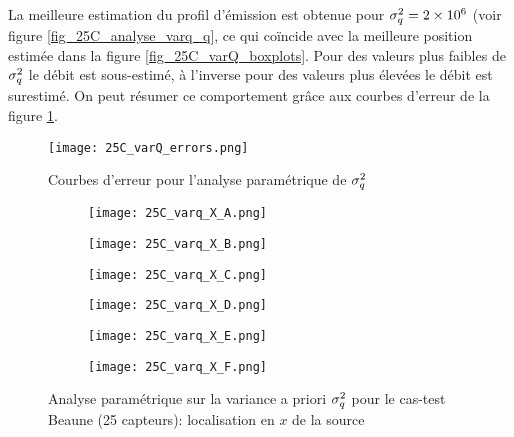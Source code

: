 La meilleure estimation du profil d'émission est obtenue pour $\sigma_q^2=2\times 10^6$ (voir figure \ref{fig_25C_analyse_varq_q}, ce qui coïncide avec la meilleure position estimée dans la figure \ref{fig_25C_varQ_boxplots}. Pour des valeurs plus faibles de $\sigma_q^2$ le débit est sous-estimé, à l'inverse pour des valeurs plus élevées le débit est surestimé. On peut résumer ce comportement grâce aux courbes d'erreur de la figure \ref{fig_25C_varq_erreurs}.

         \begin{figure}[h!]
         	\centering
         	\texttt{[image: 25C\_varQ\_errors.png]}
         	\caption{Courbes d'erreur pour l'analyse paramétrique de $\sigma_q^2$}
         	\label{fig_25C_varq_erreurs}
         \end{figure}
 



\begin{figure}[p!]
	\centering
	\begin{subfigure}[t]{0.5\textwidth}
		\centering
		\texttt{[image: 25C\_varq\_X\_A.png]}
		\caption{}
		\label{varq_A_x}
	\end{subfigure}%
	\begin{subfigure}[t]{0.5\textwidth}
		\centering
		\texttt{[image: 25C\_varq\_X\_B.png]}
		\caption{}
		\label{varq_B_x}
	\end{subfigure}
	\begin{subfigure}[t]{0.5\textwidth}
		\centering
		\texttt{[image: 25C\_varq\_X\_C.png]}
		\caption{}
		\label{varq_C_x}
	\end{subfigure}%
	\begin{subfigure}[t]{0.5\textwidth}
		\centering
		\texttt{[image: 25C\_varq\_X\_D.png]}
		\caption{}
		\label{varq_D_x}
	\end{subfigure}
	\begin{subfigure}[t]{0.5\textwidth}
		\centering
		\texttt{[image: 25C\_varq\_X\_E.png]}
		\caption{}
		\label{varq_E_x}
	\end{subfigure}%
	\begin{subfigure}[t]{0.5\textwidth}
		\centering
		\texttt{[image: 25C\_varq\_X\_F.png]}
		\caption{}
		\label{varq_F_x}
	\end{subfigure}
	\caption{Analyse paramétrique sur la variance a priori $\sigma_q^2$ pour le cas-test Beaune (25 capteurs): localisation en $x$ de la source}
	\label{fig_25C_analyse_varq_x}
\end{figure}

